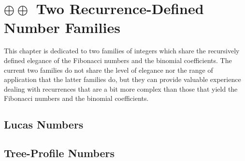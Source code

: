 
\chapter{$\oplus \oplus$ Two Recurrence-Defined Number Families}
\label{ch:recurrent-numbers-appendix}


\noindent {}

\bigskip

\noindent
This chapter is dedicated to two families of integers which share the recursively defined elegance of the Fibonacci numbers and the binomial coefficients.  The current two families do not share the level of elegance nor the range of application that the latter families do, but they can provide valuable experience dealing with recurrences that are a bit more complex than those that yield the Fibonacci numbers and the binomial coefficients.


\section{Lucas Numbers}
\label{sec:Lucas-numbers}




\section{Tree-Profile Numbers}
\label{sec:Tree-Profile-numbers}


